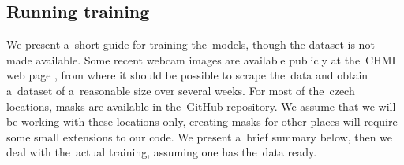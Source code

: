 \subsection{Running training} \label{running_training}

We present a~short guide for training the~models, though the dataset is not made available. Some recent webcam images are available publicly at the~CHMI web page \citep{chmi_webcams}, from where it should be possible to scrape the~data and obtain a~dataset of a~reasonable size over several weeks. For most of the~czech locations, masks are available in the~GitHub repository. We assume that we will be working with these locations only, creating masks for other places will require some small extensions to our code. We present a~brief summary below, then we deal with the~actual training, assuming one has the~data ready.

